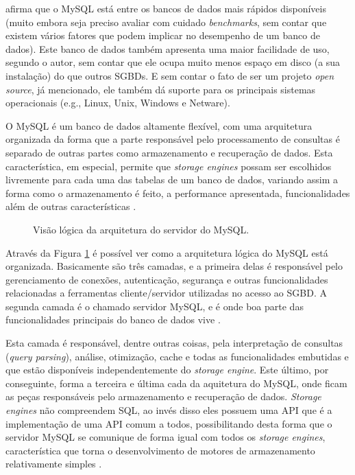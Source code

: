\documentclass[diss]{template/setrem}
\begin{document}
\citet{Dubois2009} afirma que o MySQL está entre os bancos de dados mais rápidos disponíveis (muito embora seja preciso avaliar com cuidado \emph{benchmarks}, sem contar que existem vários fatores que podem implicar no desempenho de um banco de dados). Este banco de dados também apresenta uma maior facilidade de uso, segundo o autor, sem contar que ele ocupa muito menos espaço em disco (a sua instalação) do que outros SGBDs. E sem contar o fato de ser um projeto \emph{open source}, já mencionado, ele também dá suporte para os principais sistemas operacionais (e.g., Linux, Unix, Windows e Netware).

O MySQL é um banco de dados altamente flexível, com uma arquitetura organizada da forma que a parte responsável pelo processamento de consultas é separado de outras partes como armazenamento e recuperação de dados. Esta característica, em especial, permite que \emph{storage engines} possam ser escolhidos livremente para cada uma das tabelas de um banco de dados, variando assim a forma como o armazenamento é feito, a performance apresentada, funcionalidades além de outras características \citep{Schwartz2008}.

\begin{figure}[!h]
    \caption{Visão lógica da arquitetura do servidor do MySQL.}
    \label{fig:mysql-architecture}
\end{figure}

Através da Figura \ref{fig:mysql-architecture} é possível ver como a arquitetura lógica do MySQL está organizada. Basicamente são três camadas, e a primeira delas é responsável pelo gerenciamento de conexões, autenticação, segurança e outras funcionalidades relacionadas a ferramentas cliente/servidor utilizadas no acesso ao SGBD. A segunda camada é o chamado servidor MySQL, e é onde boa parte das funcionalidades principais do banco de dados vive \citep{Schwartz2008}.

Esta camada é responsável, dentre outras coisas, pela interpretação de consultas (\emph{query parsing}), análise, otimização, cache e todas as funcionalidades embutidas e que estão disponíveis independentemente do \emph{storage engine}. Este último, por conseguinte, forma a terceira e última cada da aquitetura do MySQL, onde ficam as peças responsáveis pelo armazenamento e recuperação de dados. \emph{Storage engines} não compreendem SQL, ao invés disso eles possuem uma API que é a implementação de uma API comum a todos, possibilitando desta forma que o servidor MySQL se comunique de forma igual com todos os \emph{storage engines}, característica que torna o desenvolvimento de motores de armazenamento relativamente simples \citep{Schwartz2008}.
\end{document}
